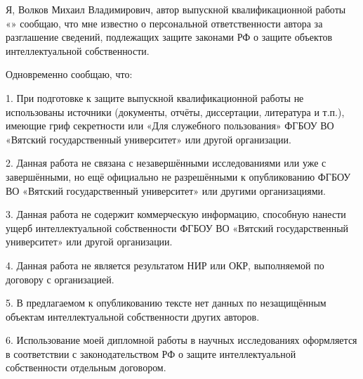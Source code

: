 \begin{singlespace}

	\newcommand{\authorfullname}{Волков Михаил Владимирович}
	\renewcommand{\authorwithinitials}{Волков М. В.}
	\renewcommand{\headofdepartment}{М. Л. Долженкова}

	Я, \authorfullname , автор выпускной квалификационной
	работы «\topic» сообщаю, что мне известно о персональной ответственности автора
	за разглашение сведений, подлежащих защите законами РФ о защите объектов
	интеллектуальной собственности.

	Одновременно сообщаю, что:

	1. При подготовке к защите выпускной квалификационной работы не
	использованы источники (документы, отчёты, диссертации, литература и т.п.),
	имеющие гриф секретности или «Для служебного пользования» ФГБОУ ВО
	«Вятский государственный университет» или другой организации.

	2. Данная работа не связана с незавершёнными исследованиями или уже
	с завершёнными, но ещё официально не разрешёнными к опубликованию
	ФГБОУ ВО «Вятский государственный университет» или другими
	организациями.

	3. Данная работа не содержит коммерческую информацию, способную
	нанести ущерб интеллектуальной собственности ФГБОУ ВО «Вятский
	государственный университет» или другой организации.

	4. Данная работа не является результатом НИР или ОКР, выполняемой по
	договору с организацией.

	5. В предлагаемом к опубликованию тексте нет данных по
	незащищённым объектам интеллектуальной собственности других авторов.

	6. Использование моей дипломной работы в научных исследованиях
	оформляется в соответствии с законодательством РФ о защите интеллектуальной
	собственности отдельным договором.

	\newcommand{\daysize}{2em}

	\newcommand{\confirm}{
		\noindent
		Сведения по авторской справке подтверждаю:~«\uline{\hspace{\daysize}}»
	}

	\newcommand{\verticalspacesize}{2em}

	\newcommand{\rightindent}{2em}

	\newcommand{\customtheyear}{\the\year~г.}

	\newcommand{\rightindentwithyear}{\widthof{\customtheyear}+\rightindent}

	\newcommand{\signaturesize}{6.6em}


\end{singlespace}
